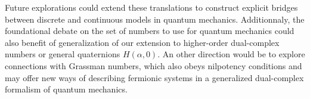 \documentclass{article}
\begin{document}
Future explorations could extend these translations to construct explicit bridges between discrete and continuous models in quantum mechanics. Additionnaly, the foundational debate on the set of numbers to use for quantum mechanics could also benefit of generalization of our extension to higher-order dual-complex numbers or general quaternions $H(\alpha, 0)$. An other direction would be to explore connections with Grassman numbers, which also obeys nilpotency conditions and may offer new ways of describing fermionic systems in a generalized dual-complex formalism of quantum mechanics.



\end{document}
